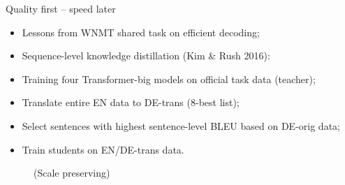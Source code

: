\documentclass[aspectratio=169]{beamer}					%
\begin{document}
\begin{frame}{Quality first -- speed later}
\begin{itemize}
\item Lessons from WNMT shared task on efficient decoding;
\item Sequence-level knowledge distillation (Kim \& Rush 2016):
\item Training four Transformer-big models on official task data (teacher);
\item Translate entire EN data to DE-trans (8-best list);
\item Select sentences with highest sentence-level BLEU based on DE-orig data;
\item Train students on EN/DE-trans data.
\end{itemize}
\end{frame}

\begin{frame}{}
\begin{figure}
\centering
{}

\vspace{3mm}
(Scale preserving)
\end{figure}
\end{frame}
\end{document}
